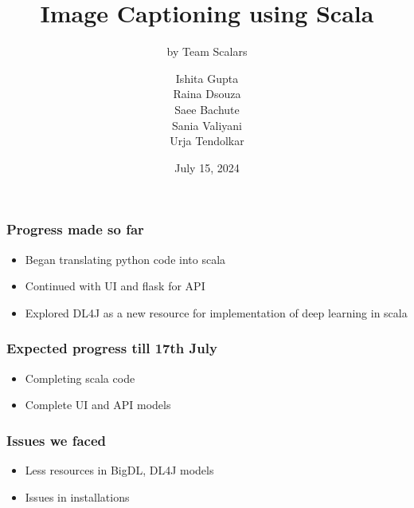 \documentclass{beamer}
\title[Image Captioning using Scala]
{Image Captioning using Scala}
\subtitle{by Team Scalars}
\author[Ishita, Raina, Saee, Sania, Urja] %
{Ishita Gupta \\ Raina Dsouza \\ Saee Bachute \\ Sania Valiyani \\ Urja Tendolkar}
\date[July 15, 2024] %
{July 15, 2024}
\begin{document}
\frame{\titlepage}

\begin{frame}
\frametitle{Progress made so far}

\begin{itemize}
    \item Began translating python code into scala
    \item Continued with UI and flask for API
    \item Explored DL4J as a new resource for implementation of deep learning in scala
\end{itemize}
\end{frame}

\begin{frame}
\frametitle{Expected progress till 17th July}
\begin{itemize}
    \item Completing scala code
    \item Complete UI and API models
\end{itemize}
\end{frame}

\begin{frame}
\frametitle{Issues we faced}
\begin{itemize}
    \item Less resources in BigDL, DL4J models
    \item Issues in installations
\end{itemize}
\end{frame}
\end{document}
